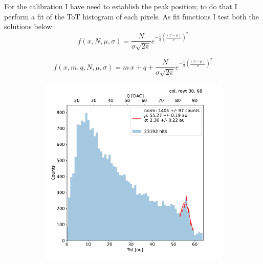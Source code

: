         For the calibration I have need to establish the peak position; to do that I perform a fit of the ToT histogram of each pixels. As fit functions I test both the solutions below:  
        \begin{equation}
            f(x, N, \mu, \sigma) = \frac{N}{\sigma \sqrt{2\pi}} e^{-\frac{1}{2}(\frac{(x-\mu)}{\sigma})^2}
        \end{equation} 

        \begin{equation}
            f(x, m, q, N, \mu, \sigma) = m\,x + q + \frac{N}{\sigma \sqrt{2\pi}} e^{-\frac{1}{2}(\frac{(x-\mu)}{\sigma})^2}
        \end{equation}          
        
        \begin{figure}[h!]
            \begin{subfigure}{.5\textwidth}
            \centering
            \includegraphics[width=.99\linewidth]{figures/charaterization/fit_gauss_r69.pdf}
            \label{fig:}
            \end{subfigure}
            \begin{subfigure}{.5\textwidth}
            \centering

\end{subfigure}
\end{figure}
